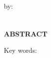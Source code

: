 \clearpage
{}
{}
\begin{center}
    \textbf{\large{\judulen}}\\[0.5cm]
    by:\\
    \penulis\\
    \nim\\[2em]
    \textbf{ABSTRACT}\\[0.5cm]
\end{center}

\noindent Key words: \keywords